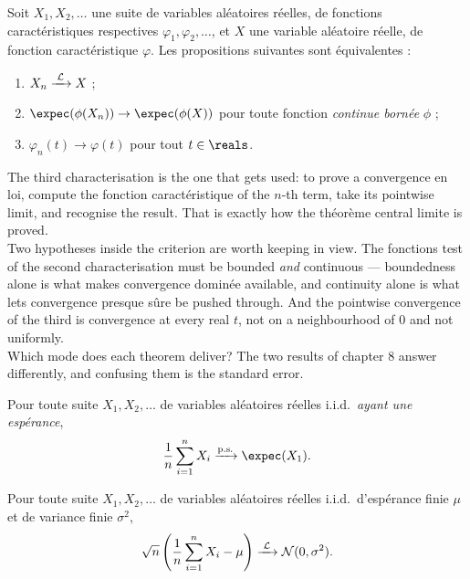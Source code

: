 \begin{theorem}
  Soit $X_{1}, X_{2}, \dots$ une suite de variables aléatoires réelles, de
  fonctions caractéristiques respectives $\varphi_{1}, \varphi_{2}, \dots$, et
  $X$ une variable aléatoire réelle, de fonction caractéristique $\varphi$. Les
  propositions suivantes sont équivalentes :
  \begin{enumerate}
    \item $X_{n} \xrightarrow{\;\mathcal{L}\;} X$ ;
    \item $\expec(\phi(X_{n})) \to \expec(\phi(X))$ pour toute fonction
      \emph{continue bornée} $\phi$ ;
    \item $\varphi_{n}(t) \to \varphi(t)$ pour tout $t \in \reals$.
  \end{enumerate}
\end{theorem}

The third characterisation is the one that gets used: to prove a convergence en
loi, compute the fonction caractéristique of the $n$-th term, take its
pointwise limit, and recognise the result. That is exactly how the théorème
central limite is proved.\\
Two hypotheses inside the criterion are worth keeping in view. The fonctions test
of the second characterisation must be bounded \emph{and} continuous ---
boundedness alone is what makes convergence dominée available, and continuity
alone is what lets convergence presque sûre be pushed through. And the pointwise
convergence of the third is convergence at every real $t$, not on a neighbourhood
of $0$ and not uniformly.\\
Which mode does each theorem deliver? The two results of chapter 8 answer
differently, and confusing them is the standard error.

\begin{theorem}
  Pour toute suite $X_{1}, X_{2}, \dots$ de variables aléatoires réelles
  i.i.d.\ \emph{ayant une espérance},
  \[
    \frac{1}{n}\sum_{i=1}^{n} X_{i} \cvas \expec(X_{1}).
  \]
\end{theorem}

\begin{theorem}
  Pour toute suite $X_{1}, X_{2}, \dots$ de variables aléatoires réelles
  i.i.d.\ d'espérance finie $\mu$ et de variance finie $\sigma^{2}$,
  \[
    \sqrt{n}\left(\frac{1}{n}\sum_{i=1}^{n} X_{i} - \mu\right)
      \xrightarrow{\;\mathcal{L}\;} \mathcal{N}(0,\sigma^{2}).
  \]
\end{theorem}

